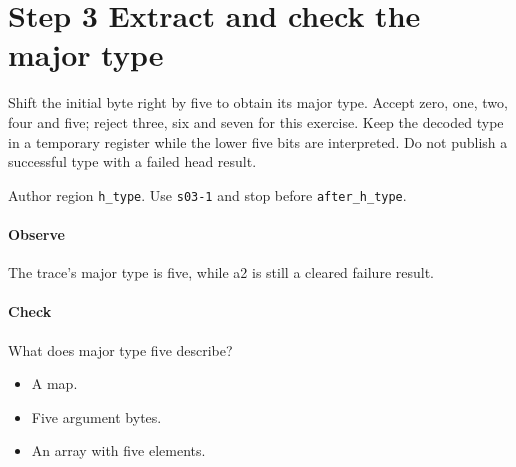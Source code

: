\section{Step 3 Extract and check the major type}\label{cbor-s03}
Shift the initial byte right by five to obtain its major type. Accept zero, one, two, four and five; reject three, six and seven for this exercise. Keep the decoded type in a temporary register while the lower five bits are interpreted. Do not publish a successful type with a failed head result.

Author region \texttt{h\_type}. Use \texttt{s03-1} and stop before \texttt{after\_h\_type}.

\paragraph{Observe} The trace's major type is five, while a2 is still a cleared failure result.

\paragraph{Check} What does major type five describe?
\begin{itemize}
\item[A.] A map.
\item[B.] Five argument bytes.
\item[C.] An array with five elements.
\end{itemize}
